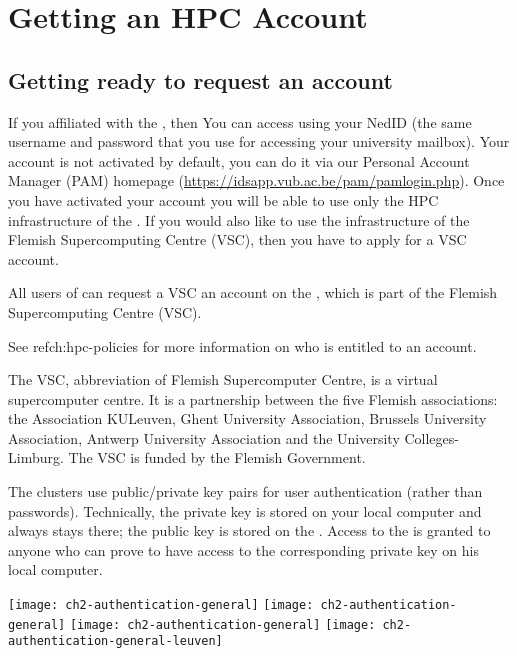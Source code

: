 \chapter{Getting an HPC Account}
\label{ch:getting-a-hpc-account}

\section{Getting ready to request an account}
\label{sec:getting-ready-to-request-an-account}

\ifbrussel
 If you affiliated with the \university, then You can access \hpc using your NedID
 (the same username and password that you use for accessing your university mailbox).
 Your \hpc account is not activated by default, you can do it via our Personal
 Account Manager (PAM) homepage (\url{https://idsapp.vub.ac.be/pam/pamlogin.php}).
 Once you have activated your \hpcname account you will be able to use only the HPC
 infrastructure of the \university. If you would also like to use the infrastructure of
 the Flemish Supercomputing Centre (VSC), then you have to apply for a VSC account.
\fi

All users of \association can request
\ifbrussel
 a VSC
 \else
 an
\fi
account on
the \hpc, which is part of the Flemish Supercomputing Centre (VSC).

See ref{ch:hpc-policies} for more information on who is entitled to an account.

The VSC, abbreviation of Flemish Supercomputer Centre, is a virtual
supercomputer centre. It is a partnership between the five Flemish
associations: the Association KULeuven,  Ghent University Association, Brussels
University Association, Antwerp University Association and the University
Colleges-Limburg. The VSC is funded by the Flemish Government.


The \hpcInfra clusters use public/private key pairs for user authentication
(rather than passwords). Technically, the private key is stored on your local
computer and always stays there; the public key is stored on the \hpc.
Access to the \hpc is granted to anyone who can prove to have access to the
corresponding private key on his local computer.

\begin{center}
\ifantwerpen
\texttt{[image: ch2-authentication-general]}
\fi
\ifbrussel
\texttt{[image: ch2-authentication-general]}
\fi
\ifgent
\texttt{[image: ch2-authentication-general]}
\fi
\ifleuven
\texttt{[image: ch2-authentication-general-leuven]}
\fi
\end{center}

